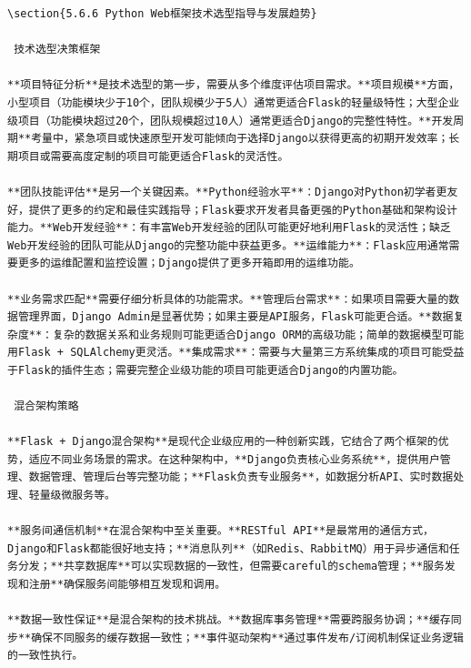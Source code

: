 \begin{lstlisting}
\section{5.6.6 Python Web框架技术选型指导与发展趋势}

 技术选型决策框架

**项目特征分析**是技术选型的第一步，需要从多个维度评估项目需求。**项目规模**方面，小型项目（功能模块少于10个，团队规模少于5人）通常更适合Flask的轻量级特性；大型企业级项目（功能模块超过20个，团队规模超过10人）通常更适合Django的完整性特性。**开发周期**考量中，紧急项目或快速原型开发可能倾向于选择Django以获得更高的初期开发效率；长期项目或需要高度定制的项目可能更适合Flask的灵活性。

**团队技能评估**是另一个关键因素。**Python经验水平**：Django对Python初学者更友好，提供了更多的约定和最佳实践指导；Flask要求开发者具备更强的Python基础和架构设计能力。**Web开发经验**：有丰富Web开发经验的团队可能更好地利用Flask的灵活性；缺乏Web开发经验的团队可能从Django的完整功能中获益更多。**运维能力**：Flask应用通常需要更多的运维配置和监控设置；Django提供了更多开箱即用的运维功能。

**业务需求匹配**需要仔细分析具体的功能需求。**管理后台需求**：如果项目需要大量的数据管理界面，Django Admin是显著优势；如果主要是API服务，Flask可能更合适。**数据复杂度**：复杂的数据关系和业务规则可能更适合Django ORM的高级功能；简单的数据模型可能用Flask + SQLAlchemy更灵活。**集成需求**：需要与大量第三方系统集成的项目可能受益于Flask的插件生态；需要完整企业级功能的项目可能更适合Django的内置功能。

 混合架构策略

**Flask + Django混合架构**是现代企业级应用的一种创新实践，它结合了两个框架的优势，适应不同业务场景的需求。在这种架构中，**Django负责核心业务系统**，提供用户管理、数据管理、管理后台等完整功能；**Flask负责专业服务**，如数据分析API、实时数据处理、轻量级微服务等。

**服务间通信机制**在混合架构中至关重要。**RESTful API**是最常用的通信方式，Django和Flask都能很好地支持；**消息队列**（如Redis、RabbitMQ）用于异步通信和任务分发；**共享数据库**可以实现数据的一致性，但需要careful的schema管理；**服务发现和注册**确保服务间能够相互发现和调用。

**数据一致性保证**是混合架构的技术挑战。**数据库事务管理**需要跨服务协调；**缓存同步**确保不同服务的缓存数据一致性；**事件驱动架构**通过事件发布/订阅机制保证业务逻辑的一致性执行。
\end{lstlisting}

